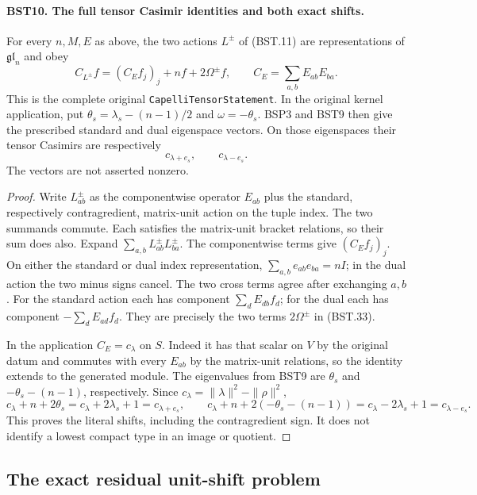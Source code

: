 \paragraph{BST10. The full tensor Casimir identities and both exact shifts.}
\label{claim:BST10}
For every $n,M,E$ as above, the two actions $L^\pm$ of (BST.11)
are representations of $\mathfrak{gl}_n$ and obey
\[
 C_{L^\pm}f=(C_Ef_j)_j+n f+2\Omega^\pm f,
 \qquad C_E=\sum_{a,b}E_{ab}E_{ba}.
 \tag{BST.33}
\]
This is the complete original \texttt{CapelliTensorStatement}.
In the original kernel application, put
$\theta_s=\lambda_s-(n-1)/2$ and $\omega=-\theta_s$.
BSP3 and BST9 then give the prescribed standard and dual
eigenspace vectors.  On those eigenspaces their tensor Casimirs are
respectively
\[
                 c_{\lambda+e_s},\qquad c_{\lambda-e_s}.
 \tag{BST.34}
\]
The vectors are not asserted nonzero.

\begin{proof}
Write $L^\pm_{ab}$ as the componentwise operator $E_{ab}$ plus
the standard, respectively contragredient, matrix-unit action on
the tuple index.  The two summands commute.  Each satisfies the
matrix-unit bracket relations, so their sum does also.
Expand $\sum_{a,b}L^\pm_{ab}L^\pm_{ba}$.
The componentwise terms give $(C_Ef_j)_j$.
On either the standard or dual index representation,
$\sum_{a,b}e_{ab}e_{ba}=nI$; in the dual action the two minus
signs cancel.  The two cross terms agree after exchanging $a,b$.
For the standard action each has component
$\sum_dE_{db}f_d$; for the dual each has component
$-\sum_dE_{ad}f_d$.  They are precisely the two terms
$2\Omega^\pm$ in (BST.33).

In the application $C_E=c_\lambda$ on $S$.
Indeed it has that scalar on $V$ by the original datum and commutes
with every $E_{ab}$ by the matrix-unit relations, so the identity
extends to the generated module.
The eigenvalues from BST9 are
$\theta_s$ and $-\theta_s-(n-1)$, respectively.
Since $c_\lambda=\|\lambda\|^2-\|\rho\|^2$,
\[
 c_\lambda+n+2\theta_s=c_\lambda+2\lambda_s+1
        =c_{\lambda+e_s},\qquad
 c_\lambda+n+2(-\theta_s-(n-1))
        =c_\lambda-2\lambda_s+1=c_{\lambda-e_s}.
 \tag{BST.35}
\]
This proves the literal shifts, including the contragredient sign.
It does not identify a lowest compact type in an image or quotient.
\end{proof}

\subsection{The exact residual unit-shift problem}

